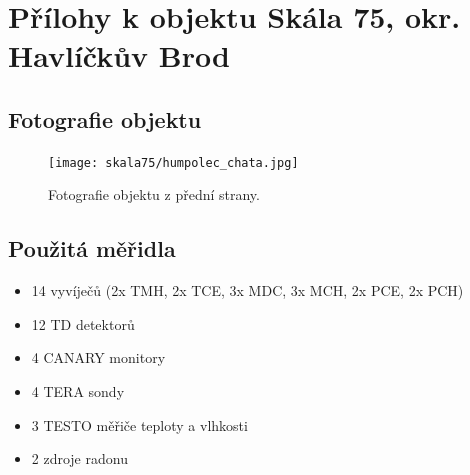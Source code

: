 \chapter{Přílohy k objektu Skála 75, okr. Havlíčkův Brod}\label{navesti:priloha_skala75}

\section{Fotografie objektu}

\begin{figure}[H]
    \centering
    \texttt{[image: skala75/humpolec\_chata.jpg]}
    \caption{Fotografie objektu z přední strany.}
    \label{fig:skala75}
\end{figure}



\section{Použitá měřidla}
\begin{itemize}
    \setlength\itemsep{0em}
	\item 14 vyvíječů (2x TMH, 2x TCE, 3x MDC, 3x MCH, 2x PCE, 2x PCH)
	\item 12 TD detektorů
	\item 4 CANARY monitory
	\item 4 TERA sondy
	\item 3 TESTO měřiče teploty a vlhkosti
	\item 2 zdroje radonu
\end{itemize}

